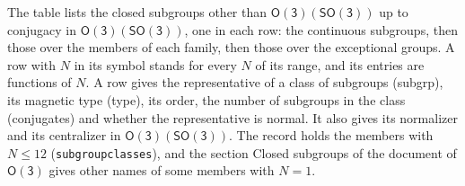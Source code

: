 \documentclass[10pt,a4paper]{article}
\numberwithin{equation}{section}
\newcommand{\grp}[1]{\mathsf{#1}}
\begin{document}
The table lists the closed subgroups other than $\grp{O(3)}(\grp{SO(3)})$ up to conjugacy in $\grp{O(3)}(\grp{SO(3)})$, one in each row: the continuous subgroups, then those over the members of each family, then those over the exceptional groups. \label{n:index.family.N}A row with $N$ in its symbol stands for every $N$ of its range, and its entries are functions of $N$. \label{n:head.subgroup}\label{n:head.magnetic.type}\label{n:head.order}\label{n:head.conjugates}\label{n:head.normal}A row gives the representative of a class of subgroups (subgrp), its magnetic type (type), its order, the number of subgroups in the class (conjugates) and whether the representative is normal. \label{n:head.normalizer}\label{n:head.centralizer}It also gives its normalizer and its centralizer in $\grp{O(3)}(\grp{SO(3)})$. The record holds the members with $N \le 12$ (\texttt{subgroupclasses}), and the section Closed subgroups of the document of \href{../../../rotation/data/pdf/O3.pdf}{$\grp{O(3)}$} gives other names of some members with $N = 1$.
\end{document}
